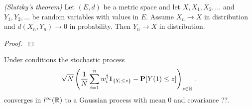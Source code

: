 \begin{theorem}
  \emph{(Slutzky's theorem)}
  Let
  $
  (E,d)
  $
  be a metric space 
  and let
  $X,X_1,X_2,\ldots$
  and
  $Y_1,Y_2,\ldots$
  be random variables with values in $E$.
  Assume
  $X_n\to X$ in distribution and 
  $d(X_n,Y_n)\to 0$ in probability. Then 
  $Y_n\to X$ in distribution.
\end{theorem}
\begin{proof}
  \cite[Theorem~13.8]{Klenke2020}
\end{proof}

\begin{ftheorem}
  Under conditions 
the stochastic process
\begin{gather}
    \sqrt{N}
    \left( 
  \frac{1}{N}
    \sum_{i=1}^{n} 
    w_i^\dagger
    \mathbf{1}
    _{\left\{ Y_i\le z \right\}}
    -
    \mathbf{P}[Y(1)\le z]
    \right)
    _{z\in\mathbb{R}}
    \,.
  \end{gather}
  converges in
  $l^\infty(\mathbb{R})$
  to a Gaussian process with mean 0 and covariance ??.
\end{ftheorem}
